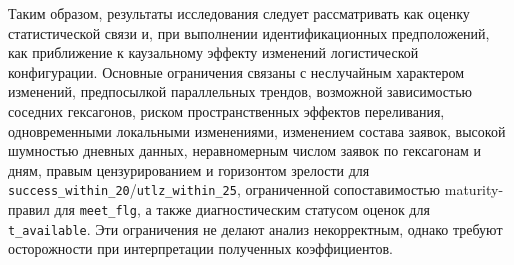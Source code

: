 \documentclass[14pt,a4paper]{extarticle}
\begin{document}
Таким образом, результаты исследования следует рассматривать как оценку статистической связи и, при выполнении идентификационных предположений, как приближение к каузальному эффекту изменений логистической конфигурации. Основные ограничения связаны с неслучайным характером изменений, предпосылкой параллельных трендов, возможной зависимостью соседних гексагонов, риском пространственных эффектов переливания, одновременными локальными изменениями, изменением состава заявок, высокой шумностью дневных данных, неравномерным числом заявок по гексагонам и дням, правым цензурированием и горизонтом зрелости для \texttt{success\_within\_20}/\texttt{utlz\_within\_25}, ограниченной сопоставимостью maturity-правил для \texttt{meet\_flg}, а также диагностическим статусом оценок для \texttt{t\_available}. Эти ограничения не делают анализ некорректным, однако требуют осторожности при интерпретации полученных коэффициентов.
\end{document}
